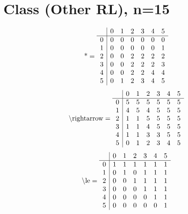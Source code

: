 \documentclass[11pt]{article}
\begin{document}
\section{Class (Other RL), n=15}
\[\text{*} = 
\begin{array}{r | r r r r r r}
 & 0 & 1 & 2 & 3 & 4 & 5 \\ \hline
0 & 0 & 0 & 0 & 0 & 0 & 0 \\
1 & 0 & 0 & 0 & 0 & 0 & 1 \\
2 & 0 & 0 & 2 & 2 & 2 & 2 \\
3 & 0 & 0 & 2 & 2 & 2 & 3 \\
4 & 0 & 0 & 2 & 2 & 4 & 4 \\
5 & 0 & 1 & 2 & 3 & 4 & 5 \\
\end{array}
\]
\[\text{\textbackslash rightarrow} = 
\begin{array}{r | r r r r r r}
 & 0 & 1 & 2 & 3 & 4 & 5 \\ \hline
0 & 5 & 5 & 5 & 5 & 5 & 5 \\
1 & 4 & 5 & 4 & 5 & 5 & 5 \\
2 & 1 & 1 & 5 & 5 & 5 & 5 \\
3 & 1 & 1 & 4 & 5 & 5 & 5 \\
4 & 1 & 1 & 3 & 3 & 5 & 5 \\
5 & 0 & 1 & 2 & 3 & 4 & 5 \\
\end{array}
\]
\[\text{\textbackslash le} = 
\begin{array}{r | r r r r r r}
 & 0 & 1 & 2 & 3 & 4 & 5 \\ \hline
0 & 1 & 1 & 1 & 1 & 1 & 1 \\
1 & 0 & 1 & 0 & 1 & 1 & 1 \\
2 & 0 & 0 & 1 & 1 & 1 & 1 \\
3 & 0 & 0 & 0 & 1 & 1 & 1 \\
4 & 0 & 0 & 0 & 0 & 1 & 1 \\
5 & 0 & 0 & 0 & 0 & 0 & 1 \\
\end{array}
\]
\end{document}
